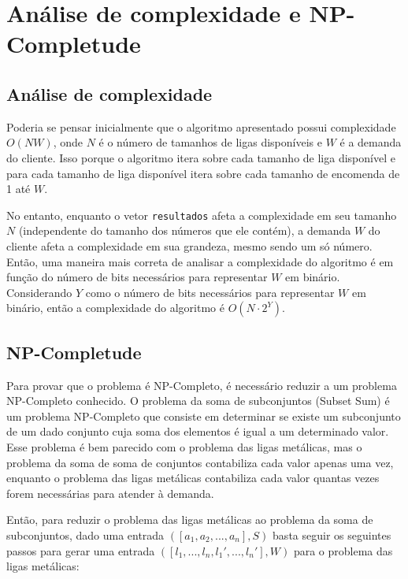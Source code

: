 \documentclass[12pt]{article}
\begin{document}
\section{Análise de complexidade e NP-Completude}
	\subsection*{Análise de complexidade}
		\par Poderia se pensar inicialmente que o algoritmo apresentado possui complexidade $O(NW)$, onde $N$ é o número de tamanhos de ligas disponíveis e $W$ é a demanda do cliente. Isso porque o algoritmo itera sobre cada tamanho de liga disponível e para cada tamanho de liga disponível itera sobre cada tamanho de encomenda de 1 até $W$.
		
		\par No entanto, enquanto o vetor \texttt{resultados} afeta a complexidade em seu tamanho $N$ (independente do tamanho dos números que ele contém), a demanda $W$ do cliente afeta a complexidade em sua grandeza, mesmo sendo um só número. Então, uma maneira mais correta de analisar a complexidade do algoritmo é em função do número de bits necessários para representar $W$ em binário. Considerando $Y$ como o número de bits necessários para representar $W$ em binário, então a complexidade do algoritmo é $O(N \cdot 2^Y)$.

	\subsection*{NP-Completude}
		\par Para provar que o problema é NP-Completo, é necessário reduzir a um problema NP-Completo conhecido. O problema da soma de subconjuntos (Subset Sum) é um problema NP-Completo que consiste em determinar se existe um subconjunto de um dado conjunto cuja soma dos elementos é igual a um determinado valor. Esse problema é bem parecido com o problema das ligas metálicas, mas o problema da soma de soma de conjuntos contabiliza cada valor apenas uma vez, enquanto o problema das ligas metálicas contabiliza cada valor quantas vezes forem necessárias para atender à demanda.

		\par Então, para reduzir o problema das ligas metálicas ao problema da soma de subconjuntos, dado uma entrada $([a_1, a_2, ..., a_n], S)$ basta seguir os seguintes passos para gerar uma entrada $([l_1, ..., l_n, l_1', ..., l_n'], W)$ para o problema das ligas metálicas:
\end{document}
